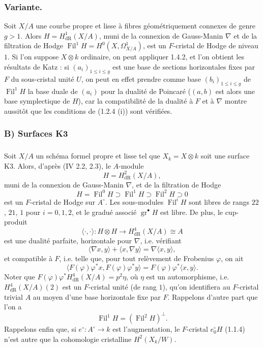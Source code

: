 \documentclass[12pt,a4paper]{article}
\theoremstyle{plain}
\theoremstyle{definition}
\theoremstyle{remark}
\DeclareMathOperator{\Fil}{Fil}
\DeclareMathOperator{\gr}{gr}
\begin{document}
\subsubsection{Variante.}
Soit $X/A$ une courbe propre et lisse \`a fibres g\'eom\'etriquement connexes de genre $g > 1$. Alors $H = H^1_\mathrm{dR}(X/A)$, muni de la connexion de Gauss-Manin $\nabla$ et de la filtration de Hodge $\Fil^1 H = H^0(X, \Omega^1_{X/A})$, est un $F$-cristal de Hodge de niveau $1$. Si l'on suppose $X \otimes k$ ordinaire, on peut appliquer 1.4.2, et l'on obtient les r\'esultats de Katz \cite[\S 8]{Katz1973} : si $(a_i)_{1\leqslant i\leqslant g}$ est une base de sections horizontales fixes par $F$ du sous-cristal unit\'e $U$, on peut en effet prendre comme base $(b_i)_{1\leqslant i\leqslant g}$ de $\Fil^1 H$ la base duale de $(a_i)$ pour la dualit\'e de Poincar\'e ($(a, b)$ est alors une base symplectique de $H$), car la compatibilit\'e de la dualit\'e \`a $F$ et \`a $\nabla$ montre aussit\^ot que les conditions de (1.2.4 (i)) sont v\'erifi\'ees.

\subsubsection{B) Surfaces K3}

\setcounter{subsubsection}{4}

\subsubsection{}
Soit $X/A$ un sch\'ema formel propre et lisse tel que $X_k = X \otimes k$ soit une surface K3. Alors, d'apr\`es (IV 2.2, 2.3), le $A$-module
\[
H = H^2_\mathrm{dR}(X/A),
\]
muni de la connexion de Gauss-Manin $\nabla$, et de la filtration de Hodge
\[
H = \Fil^0 H \supset \Fil^1 H \supset \Fil^2 H \supset 0
\]
est un $F$-cristal de Hodge sur $A^\circ$. Les sous-modules $\Fil^i H$ sont libres de rangs $22$, $21$, $1$ pour $i = 0, 1, 2$, et le gradu\'e associ\'e $\gr^\bullet H$ est libre. De plus, le cup-produit
\[
\langle \cdot, \cdot \rangle : H \otimes H \longrightarrow H^4_\mathrm{dR}(X/A) \cong A
\]
est une dualit\'e parfaite, horizontale pour $\nabla$, i.e. v\'erifiant
\[
\langle \nabla x, y \rangle + \langle x, \nabla y \rangle = \nabla\langle x, y \rangle,
\]
et compatible \`a $F$, i.e. telle que, pour tout rel\`evement de Frobenius $\varphi$, on ait
\[
\langle F(\varphi)\varphi^* x, F(\varphi)\varphi^* y \rangle = F(\varphi)\varphi^*\langle x, y \rangle.
\]
Noter que $F(\varphi)\varphi^* H^4_\mathrm{dR}(X/A) = p^2 \eta$, o\`u $\eta$ est un automorphisme, i.e. $H^4_\mathrm{dR}(X/A)(2)$ est un $F$-cristal unit\'e (de rang $1$), qu'on identifiera au $F$-cristal trivial $A$ au moyen d'une base horizontale fixe par $F$. Rappelons d'autre part que l'on a
\[
\Fil^1 H = (\Fil^2 H)^\perp.
\]
Rappelons enfin que, si $e^\circ : A^\circ \to k$ est l'augmentation, le $F$-cristal $e^\circ_0 H$ (1.1.4) n'est autre que la cohomologie cristalline $H^2(X_k/W)$.
\end{document}
